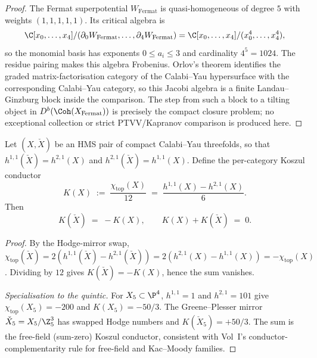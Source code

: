 \begin{proof}
The Fermat superpotential $W_{\mathrm{Fermat}}$ is quasi-homogeneous of
degree $5$ with weights $(1,1,1,1,1)$. Its critical algebra is
\[
 \C[x_0,\dots,x_4]/(\partial_0W_{\mathrm{Fermat}},\dots,
 \partial_4W_{\mathrm{Fermat}})
 =
 \C[x_0,\dots,x_4]/(x_0^4,\dots,x_4^4),
\]
so the monomial basis has exponents $0\leq a_i\leq 3$ and cardinality
$4^5=1024$. The residue pairing makes this algebra Frobenius.
Orlov's theorem \cite{Orlov2009LG} identifies the graded
matrix-factorisation category of the Calabi--Yau hypersurface with the
corresponding Calabi--Yau category, so this Jacobi algebra is a finite
Landau--Ginzburg block inside the comparison. The step from such a block
to a tilting object in $D^b(\Coh(X_{\mathrm{Fermat}}))$ is precisely the
compact closure problem; no exceptional collection or strict
PTVV/Kapranov comparison is produced here.
\end{proof}

\begin{theorem}[Conductor coincidence for HMS pairs at \texorpdfstring{$d=3$}{d=3}]
\label{thm:cy-b-d3-conductor-coincidence}
Let $(X, \check X)$ be an HMS pair of compact Calabi--Yau threefolds, so that
$h^{1,1}(\check X) = h^{2,1}(X)$ and $h^{2,1}(\check X) = h^{1,1}(X)$.
Define the per-category Koszul conductor
\[
K(X) \;:=\; \frac{\chi_{\mathrm{top}}(X)}{12}
\;=\; \frac{h^{1,1}(X) - h^{2,1}(X)}{6}.
\]
Then
\[
K(\check X) \;=\; -K(X), \qquad K(X) + K(\check X) \;=\; 0.
\]
\end{theorem}

\begin{proof}
By the Hodge-mirror swap, $\chi_{\mathrm{top}}(\check X) = 2(h^{1,1}(\check X) - h^{2,1}(\check X)) = 2(h^{2,1}(X) - h^{1,1}(X)) = -\chi_{\mathrm{top}}(X)$.
Dividing by $12$ gives $K(\check X) = -K(X)$, hence the sum vanishes.

\medskip
\noindent\textit{Specialisation to the quintic.} For $X_5\subset \P^4$, $h^{1,1}=1$ and $h^{2,1}=101$ give $\chi_{\mathrm{top}}(X_5) = -200$ and $K(X_5) = -50/3$. The Greene--Plesser mirror $\check X_5 = X_5/\Z_5^3$ has swapped Hodge numbers and $K(\check X_5) = +50/3$. The sum is the free-field (sum-zero) Koszul conductor, consistent with Vol~I's conductor-complementarity rule for free-field and Kac--Moody families.
\end{proof}

